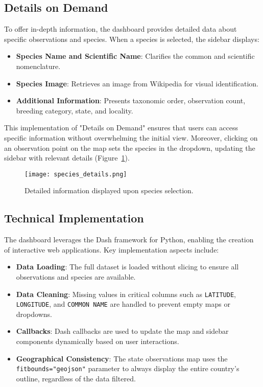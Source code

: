 \subsection{Details on Demand}

To offer in-depth information, the dashboard provides detailed data about specific observations and species. When a species is selected, the sidebar displays:

\begin{itemize} \item \textbf{Species Name and Scientific Name}: Clarifies the common and scientific nomenclature. \item \textbf{Species Image}: Retrieves an image from Wikipedia for visual identification. \item \textbf{Additional Information}: Presents taxonomic order, observation count, breeding category, state, and locality. \end{itemize}

This implementation of "Details on Demand" ensures that users can access specific information without overwhelming the initial view. Moreover, clicking on an observation point on the map sets the species in the dropdown, updating the sidebar with relevant details (Figure~\ref{fig:details_on_demand}).

\begin{figure}[h] \centering \texttt{[image: species\_details.png]} \caption{Detailed information displayed upon species selection.} \label{fig:details_on_demand} \end{figure}

\subsection{Technical Implementation}

The dashboard leverages the Dash framework for Python, enabling the creation of interactive web applications. Key implementation aspects include:

\begin{itemize} \item \textbf{Data Loading}: The full dataset is loaded without slicing to ensure all observations and species are available. \item \textbf{Data Cleaning}: Missing values in critical columns such as \texttt{LATITUDE}, \texttt{LONGITUDE}, and \texttt{COMMON NAME} are handled to prevent empty maps or dropdowns. \item \textbf{Callbacks}: Dash callbacks are used to update the map and sidebar components dynamically based on user interactions. \item \textbf{Geographical Consistency}: The state observations map uses the \texttt{fitbounds="geojson"} parameter to always display the entire country's outline, regardless of the data filtered. \end{itemize}

